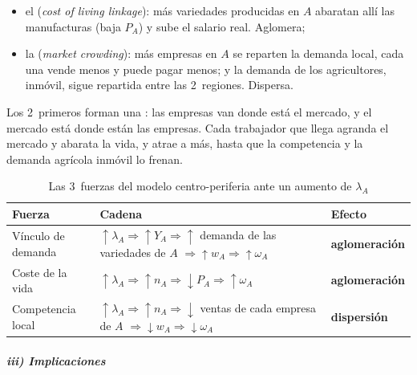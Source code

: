 \documentclass[11pt]{article}
\begin{document}
\begin{itemize}
\begin{itemize}
  \item el  (\emph{cost of living linkage}): más variedades producidas en $A$ abaratan allí las manufacturas (baja $P_A$) y sube el salario real. Aglomera;
  \item la  (\emph{market crowding}): más empresas en $A$ se reparten la demanda local, cada una vende menos y puede pagar menos; y la demanda de los agricultores, inmóvil, sigue repartida entre las 2~regiones. Dispersa.
  \end{itemize}
  Los 2~primeros forman una : las empresas van donde está el mercado, y el mercado está donde están las empresas. Cada trabajador que llega agranda el mercado y abarata la vida, y atrae a más, hasta que la competencia y la demanda agrícola inmóvil lo frenan.
\end{itemize}

\begin{table}[H]
\centering
\caption{Las 3~fuerzas del modelo centro-periferia ante un aumento de $\lambda_A$}\label{tab:mecanismos}
\small
\begin{tabular}{>{\raggedright\arraybackslash}m{3.4cm}>{\raggedright\arraybackslash}m{8.6cm}>{\centering\arraybackslash}m{2.6cm}}
\toprule
\rowcolor{tceeazulpalido}\textbf{Fuerza} & \textbf{Cadena} & \textbf{Efecto}\\
\midrule
Vínculo de demanda & $\uparrow\lambda_A\Rightarrow\uparrow Y_A\Rightarrow\uparrow$ demanda de las variedades de $A$ $\Rightarrow\uparrow w_A\Rightarrow\uparrow\omega_A$ & \textcolor{tceeverde}{\textbf{aglomeración}}\\
\addlinespace[0.3em]
Coste de la vida & $\uparrow\lambda_A\Rightarrow\uparrow n_A\Rightarrow\downarrow P_A\Rightarrow\uparrow\omega_A$ & \textcolor{tceeverde}{\textbf{aglomeración}}\\
\addlinespace[0.3em]
Competencia local & $\uparrow\lambda_A\Rightarrow\uparrow n_A\Rightarrow\downarrow$ ventas de cada empresa de $A$ $\Rightarrow\downarrow w_A\Rightarrow\downarrow\omega_A$ & \textcolor{tceerojo}{\textbf{dispersión}}\\
\bottomrule
\end{tabular}
\end{table}

\subparagraph{iii) Implicaciones}
\end{document}
